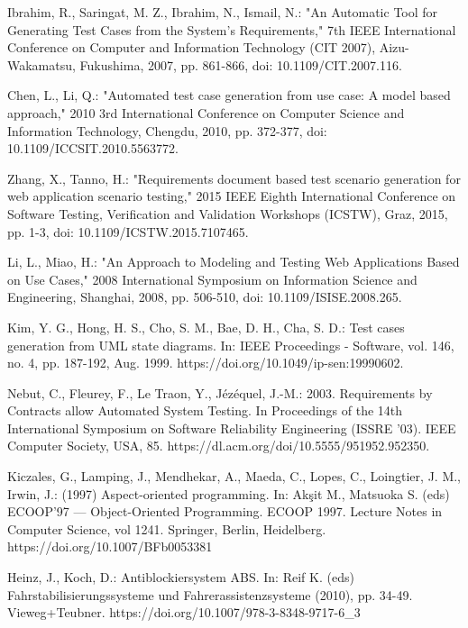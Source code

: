 \documentclass[a4paper,10pt, bibliography=totocnumbered]{scrreprt}
\begin{document}
\begin{thebibliography}{9}
 Ibrahim, R., Saringat, M. Z., Ibrahim, N., Ismail, N.: "An Automatic Tool for Generating Test Cases from the System's Requirements," 7th IEEE International Conference on Computer and Information Technology (CIT 2007), Aizu-Wakamatsu, Fukushima, 2007, pp. 861-866, doi: 10.1109/CIT.2007.116.


 Chen, L., Li, Q.: "Automated test case generation from use case: A model based approach," 2010 3rd International Conference on Computer Science and Information Technology, Chengdu, 2010, pp. 372-377, doi: 10.1109/ICCSIT.2010.5563772.

 Zhang, X., Tanno, H.: "Requirements document based test scenario generation for web application scenario testing," 2015 IEEE Eighth International Conference on Software Testing, Verification and Validation Workshops (ICSTW), Graz, 2015, pp. 1-3, doi: 10.1109/ICSTW.2015.7107465.

 Li, L., Miao, H.: "An Approach to Modeling and Testing Web Applications Based on Use Cases," 2008 International Symposium on Information Science and Engineering, Shanghai, 2008, pp. 506-510, doi: 10.1109/ISISE.2008.265.

 Kim, Y. G., Hong, H. S., Cho, S. M., Bae, D. H., Cha, S. D.: Test cases generation from UML state diagrams.
In: IEEE Proceedings - Software, vol. 146, no. 4, pp. 187-192, Aug. 1999.
https://doi.org/10.1049/ip-sen:19990602.

 Nebut, C., Fleurey, F., Le Traon, Y., Jézéquel, J.-M.: 2003. Requirements by Contracts allow Automated System Testing. In Proceedings of the 14th International Symposium on Software Reliability Engineering (ISSRE '03). IEEE Computer Society, USA, 85.
https://dl.acm.org/doi/10.5555/951952.952350.


 Kiczales, G., Lamping, J., Mendhekar, A., Maeda, C., Lopes, C., Loingtier, J. M., Irwin, J.: (1997) Aspect-oriented programming. In: Akşit M., Matsuoka S. (eds) ECOOP'97 — Object-Oriented Programming. ECOOP 1997. Lecture Notes in Computer Science, vol 1241. Springer, Berlin, Heidelberg.
https://doi.org/10.1007/BFb0053381

 Heinz, J., Koch, D.: Antiblockiersystem ABS.
In: Reif K. (eds) Fahrstabilisierungssysteme und Fahrerassistenzsysteme (2010), pp. 34-49. Vieweg+Teubner. 
https://doi.org/10.1007/978-3-8348-9717-6\_3


\end{thebibliography}
\end{document}
